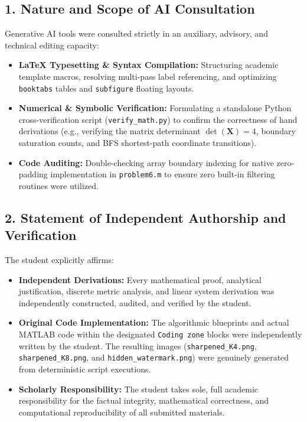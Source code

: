 \documentclass[11pt,a4paper]{article}
\begin{document}
\subsection*{1. Nature and Scope of AI Consultation}
Generative AI tools were consulted strictly in an auxiliary, advisory, and technical editing capacity:
\begin{itemize}
    \item \textbf{\LaTeX{} Typesetting \& Syntax Compilation:} Structuring academic template macros, resolving multi-pass label referencing, and optimizing \texttt{booktabs} tables and \texttt{subfigure} floating layouts.
    \item \textbf{Numerical \& Symbolic Verification:} Formulating a standalone Python cross-verification script (\texttt{verify\_math.py}) to confirm the correctness of hand derivations (e.g., verifying the matrix determinant $\det(\mathbf{X}) = 4$, boundary saturation counts, and BFS shortest-path coordinate transitions).
    \item \textbf{Code Auditing:} Double-checking array boundary indexing for native zero-padding implementation in \texttt{problem6.m} to ensure zero built-in filtering routines were utilized.
\end{itemize}

\subsection*{2. Statement of Independent Authorship and Verification}
The student explicitly affirms:
\begin{itemize}
    \item \textbf{Independent Derivations:} Every mathematical proof, analytical justification, discrete metric analysis, and linear system derivation was independently constructed, audited, and verified by the student.
    \item \textbf{Original Code Implementation:} The algorithmic blueprints and actual MATLAB code within the designated \texttt{Coding zone} blocks were independently written by the student. The resulting images (\texttt{sharpened\_K4.png}, \texttt{sharpened\_K8.png}, and \texttt{hidden\_watermark.png}) were genuinely generated from deterministic script executions.
    \item \textbf{Scholarly Responsibility:} The student takes sole, full academic responsibility for the factual integrity, mathematical correctness, and computational reproducibility of all submitted materials.
\end{itemize}
\end{document}
